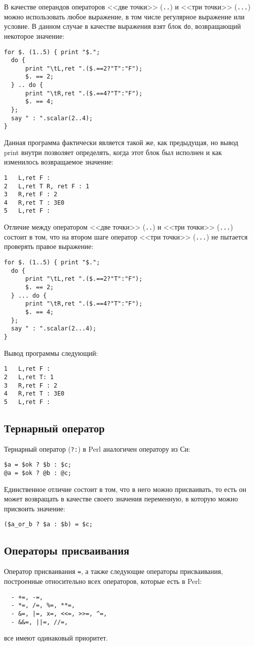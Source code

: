 В качестве операндов операторов <<две точки>> (\verb|..|) и <<три точки>> (\verb|...|) можно использовать любое выражение, в том числе регулярное выражение или условие. В данном случае в качестве выражения взят блок \verb|do|, возвращающий некоторое значение:
\begin{verbatim}
for $. (1..5) { print "$.";
  do {
      print "\tL,ret ".($.==2?"T":"F");
      $. == 2;
  } .. do {
      print "\tR,ret ".($.==4?"T":"F");
      $. == 4;
  };
  say " : ".scalar(2..4);
}
\end{verbatim}
Данная программа фактически является такой же, как предыдущая, но вывод print внутри позволяет определять, когда этот блок был исполнен и как изменилось возвращаемое значение:
\begin{verbatim}
1   L,ret F :
2   L,ret T R, ret F : 1
3   R,ret F : 2
4   R,ret T : 3E0
5   L,ret F :
\end{verbatim}
Отличие между оператором <<две точки>> (\verb|..|) и <<три точки>> (\verb|...|) состоит в том, что на втором шаге оператор <<три точки>> (\verb|...|) не пытается проверять правое выражение:
\begin{verbatim}
for $. (1..5) { print "$.";
  do {
      print "\tL,ret ".($.==2?"T":"F");
      $. == 2;
  } ... do {
      print "\tR,ret ".($.==4?"T":"F");
      $. == 4;
  };
  say " : ".scalar(2...4);
}
\end{verbatim}
Вывод программы следующий:
\begin{verbatim}
1   L,ret F :
2   L,ret T: 1
3   R,ret F : 2
4   R,ret T : 3E0
5   L,ret F :
\end{verbatim}

\subsection{Тернарный оператор}
Тернарный оператор (\verb|?:|) в Perl аналогичен оператору из Си:
\begin{verbatim}
$a = $ok ? $b : $c;
@a = $ok ? @b : @c;
\end{verbatim}
Единственное отличие состоит в том, что в него можно присваивать, то есть он может возвращать в качестве своего значения переменную, в которую можно присвоить значение:
\begin{verbatim}
($a_or_b ? $a : $b) = $c;
\end{verbatim}

\subsection{Операторы присваивания}
Оператор присваивания \verb|=|, а также следующие операторы присваивания, построенные относительно всех операторов, которые есть в Perl:
\begin{verbatim}
  - +=, -=,
  - *=, /=, %=, **=,
  - &=, |=, x=, <<=, >>=, ^=,
  - &&=, ||=, //=,
\end{verbatim}
все имеют одинаковый приоритет.


